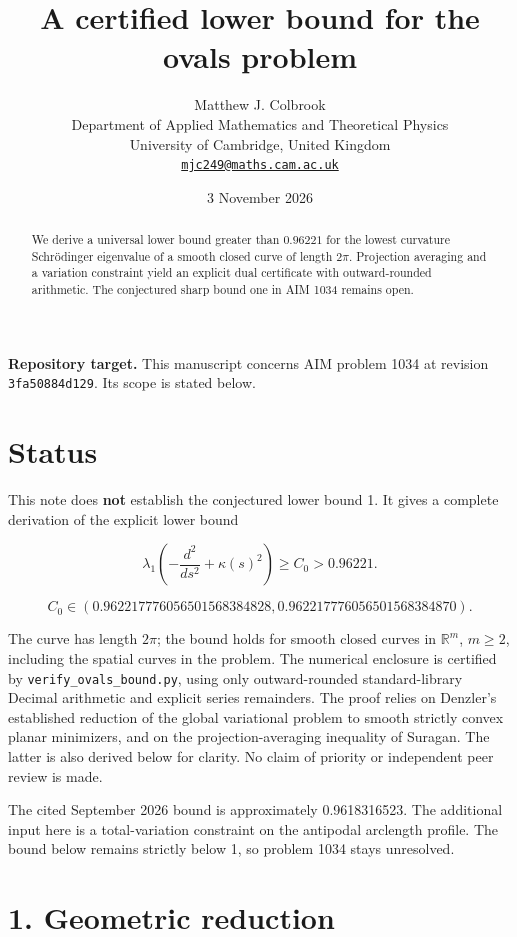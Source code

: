 \documentclass[11pt,a4paper]{article}
\title{\textbf{A certified lower bound for the ovals problem}}
\author{Matthew J. Colbrook\\[3pt]
{\small Department of Applied Mathematics and Theoretical Physics}\\
{\small University of Cambridge, United Kingdom}\\
{\small\href{mailto:mjc249@maths.cam.ac.uk}{\texttt{mjc249@maths.cam.ac.uk}}}}
\date{3 November 2026}
\begin{document}
\maketitle
\begin{abstract}
We derive a universal lower bound greater than $0.96221$ for the lowest curvature Schrödinger eigenvalue of a smooth closed curve of length $2\pi$. Projection averaging and a variation constraint yield an explicit dual certificate with outward-rounded arithmetic. The conjectured sharp bound one in AIM 1034 remains open.
\end{abstract}
\noindent\textbf{Repository target.}
This manuscript concerns AIM problem 1034 at revision
\texttt{3fa50884d129}. Its scope is stated below.
\medskip

\hypertarget{1034-status}{%
\section{Status}\label{1034-status}}

This note does \textbf{not} establish the conjectured lower bound 1. It
gives a complete derivation of the explicit lower bound

\[
\lambda_1\!\left(-\frac{d^2}{ds^2}+\kappa(s)^2\right)
\ge C_0>0.96221.
\]

\[
C_0\in(0.962217776056501568384828,
        0.962217776056501568384870).
\]

The curve has length \(2\pi\); the bound holds for smooth closed curves
in \(\mathbb R^m\), \(m\ge2\), including the spatial curves in the
problem. The numerical enclosure is certified by
\texttt{verify\_ovals\_bound.py}, using only outward-rounded
standard-library Decimal arithmetic and explicit series remainders. The
proof relies on Denzler's established reduction of the global
variational problem to smooth strictly convex planar minimizers, and on
the projection-averaging inequality of Suragan. The latter is also
derived below for clarity. No claim of priority or independent peer
review is made.

The cited September 2026 bound is approximately 0.9618316523. The
additional input here is a total-variation constraint on the antipodal
arclength profile. The bound below remains strictly below 1, so problem
1034 stays unresolved.

\hypertarget{1034-geometric-reduction}{%
\section{1. Geometric reduction}\label{1034-geometric-reduction}}
\end{document}
